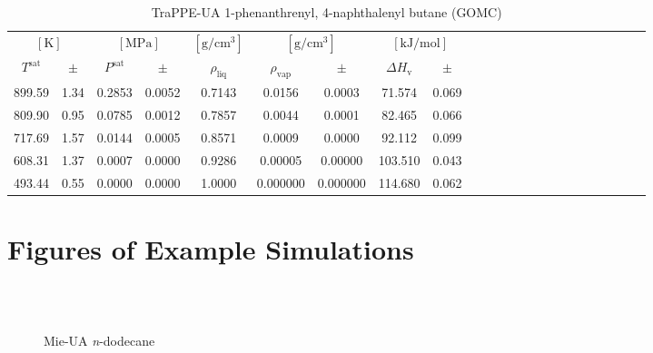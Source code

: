 \documentclass[%
 aip,
 jcp,
 sd,%
 amsmath,amssymb,
]{revtex4-1}
\begin{document}
\begin{table*}[]
\centering
\caption{
TraPPE-UA 1-phenanthrenyl, 4-naphthalenyl butane (GOMC)
}
\label{tab:TraPPE-1p4nB}
\begin{ruledtabular}
\begin{tabular}{ccccccccccccccccccccccc}
\multicolumn{2}{c}{$[\mathrm{K}]$} &	 \multicolumn{2}{c}{$[\mathrm{MPa}]$} & $[\mathrm{g/cm^3}]$ & \multicolumn{2}{c}{$[\mathrm{g/cm^3}]$} & \multicolumn{2}{c}{$[\mathrm{kJ/mol}]$} \\
$T^{\mathrm{sat}}$ & $\pm$ & $P^{\mathrm{sat}}$ & $\pm$ & $\rho_{\mathrm{liq}}$ & $\rho_{\mathrm{vap}}$ & $\pm$ & $\Delta H_{\mathrm{v}}$ & $\pm$
 \\
\hline		
899.59	&	1.34	&	0.2853	&	0.0052	&	0.7143	&	0.0156	&	0.0003	&	71.574	&	0.069	\\
809.90	&	0.95	&	0.0785	&	0.0012	&	0.7857	&	0.0044	&	0.0001	&	82.465	&	0.066	\\
717.69	&	1.57	&	0.0144	&	0.0005	&	0.8571	&	0.0009	&	0.0000	&	92.112	&	0.099	\\
608.31	&	1.37	&	0.0007	&	0.0000	&	0.9286	&	0.00005	&	0.00000	&	103.510	&	0.043	\\
493.44	&	0.55	&	0.0000	&	0.0000	&	1.0000	&	0.000000	&	0.000000	&	114.680	&	0.062	\\
\end{tabular}
\end{ruledtabular}
\end{table*}


\clearpage
\section{Figures of Example Simulations}

\begin{figure*}[!htbp]
\centering
{}\label{aa}
\label{bb}\\
\label{cc}
\label{dd}\\
\label{ee}
\label{ff}
\caption{
Mie-UA \textit{n}-dodecane
}
\label{fig:Ex_Sim_Mie-C12-mie}
\end{figure*}
\end{document}
